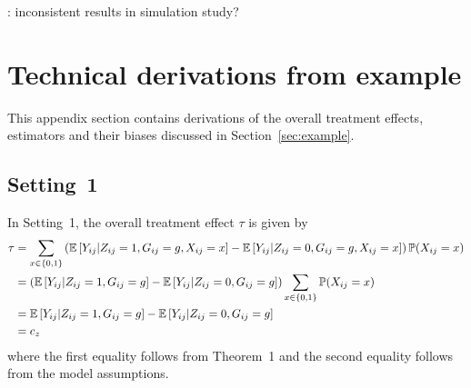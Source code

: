 \documentclass[10pt]{article}
\begin{document}
\todo: inconsistent results in simulation study?


\newpage


\begin{refcontext}[sorting=nyt]
\printbibliography
\end{refcontext}


\newpage

\appendix



\section{Technical derivations from example} \label{apx:example}

This appendix section contains derivations of the overall treatment effects, estimators and their biases discussed in Section~\ref{sec:example}.

\subsection{Setting~1} \label{apx:setting1}

In Setting~1, the overall treatment effect $\tau$ is given by
\begin{align*}
\tau %
&= \sum_{x\in\{0,1\}} \left(\E\left[Y_{ij}|Z_{ij}=1,G_{ij}=g,X_{ij}=x\right] - \E\left[Y_{ij}|Z_{ij}=0,G_{ij}=g,X_{ij}=x\right]\right)\P(X_{ij}=x) \\
&= \left(\E\left[Y_{ij}|Z_{ij}=1,G_{ij}=g\right] - \E\left[Y_{ij}|Z_{ij}=0,G_{ij}=g\right]\right)\sum_{x\in\{0,1\}}\P(X_{ij}=x) \\
&= \E\left[Y_{ij}|Z_{ij}=1,G_{ij}=g\right] - \E\left[Y_{ij}|Z_{ij}=0,G_{ij}=g\right] \\
&= c_z
\end{align*}
where the first equality follows from Theorem~1 and the second equality follows from the model assumptions.
\\
\end{document}
